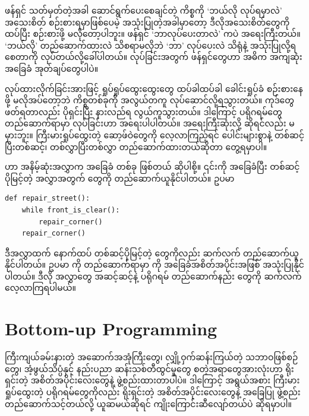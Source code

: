 ဖန်ရှင် သတ်မှတ်တဲ့အခါ ဆောင်ရွက်ပေးစေချင်တဲ့ ကိစ္စကို ‘ဘယ်လို လုပ်ရမှာလဲ’ အသေးစိတ် စဉ်းစားရမှာဖြစ်ပေမဲ့ အသုံးပြုတဲ့အခါမှာတော့ ဒီလိုအသေးစိတ်တွေကို ထပ်ပြီး စဉ်းစားဖို့ မလိုတော့ပါဘူး။ ဖန်ရှင် ‘ဘာလုပ်ပေးတာလဲ’ ကပဲ အရေးကြီးတယ်။ ‘ဘယ်လို’ တည်ဆောက်ထားလဲ သိစရာမလိုဘဲ ‘ဘာ’ လုပ်ပေးလဲ သိရုံနဲ့ အသုံးပြုလို့ရစေတာကို  လုပ်တယ်လို့ခေါ်ပါတယ်။  လုပ်ခြင်းအတွက် ဖန်ရှင်တွေဟာ အဓိက အကျဆုံး အခြေခံ အုတ်ချပ်တွေပါပဲ။ 


 လုပ်ထားလိုက်ခြင်းအားဖြင့် ရှုပ်ရှုပ်ထွေးထွေးတွေ ထပ်ခါထပ်ခါ ခေါင်းရှုပ်ခံ စဉ်းစားနေဖို့ မလိုအပ်တော့ဘဲ ကိစ္စတစ်ခုကို အလွယ်တကူ လုပ်ဆောင်လို့ရသွားတယ်။ ကုဒ်တွေဖတ်ရတာလည်း ပိုရှင်းပြီး နားလည်ရ လွယ်ကူသွားတယ်။ ဒါကြောင့် ပရိုဂရမ်တွေ တည်ဆောက်ရာမှာ  လုပ်ခြင်းဟာ အရေးပါပါတယ်။ အရေးကြီးဆုံးလို့ ဆိုရင်လည်း မမှားဘူး။  ကြီးမားရှုပ်ထွေးတဲ့ ဆော့ဖ်ဝဲတွေကို လေ့လာကြည့်ရင်   ပေါင်းများစွာနဲ့ တစ်ဆင့်ပြီးတစ်ဆင့်၊ တစ်လွှာပြီးတစ်လွှာ တည်ဆောက်ထားတယ်ဆိုတာ တွေ့ရမှာပါ။

 ဟာ အနိမ့်ဆုံးအလွှာက အခြေခံ  တစ်ခု ဖြစ်တယ် ဆိုပါစို့။ ၎င်းကို အခြေခံပြီး တစ်ဆင့်ပိုမြင့်တဲ့ အလွှာအတွက်  တွေကို တည်ဆောက်ယူနိုင်ပါတယ်။ ဥပမာ
%
\setlength{\fboxsep}{0pt}
\begin{verbatim}
def repair_street():
    while front_is_clear():
        repair_corner()
    repair_corner()
\end{verbatim}
%
ဒီအလွှာထက် နောက်ထပ် တစ်ဆင့်ပိုမြင့်တဲ့  တွေကိုလည်း ဆက်လက် တည်ဆောက်ယူနိုင်ပါတယ်။ ဥပမာ  ကို တည်ဆောက်ရာမှာ  ကို အခြေခံအစိတ်အပိုင်းအဖြစ် အသုံးပြုနိုင်ပါတယ်။ ဒီလို  အလွှာတွေ အဆင့်ဆင့်နဲ့ ပရိုဂရမ် တည်ဆောက်နည်း တွေကို ဆက်လက်လေ့လာကြရပါမယ်။


\section{Bottom-up Programming}

ကြီးကျယ်ခမ်းနားတဲ့ အဆောက်အအုံကြီးတွေ၊ လျှို့ဝှက်ဆန်းကြယ်တဲ့ သဘာဝဖြစ်စဉ်တွေ၊ အံ့ဖွယ်သိပ္ပံနှင့် နည်းပညာ ဆန်းသစ်တီထွင်မှုတွေ စတဲ့အရာတွေအားလုံးဟာ ရိုးရှင်းတဲ့ အစိတ်အပိုင်းလေးတွေနဲ့ ဖွဲ့စည်းထားတာပါပဲ။ ဒါကြောင့် အရွယ်အစား ကြီးမား ရှုပ်ထွေးတဲ့ ပရိုဂရမ်တွေကိုလည်း ရိုးရှင်းတဲ့ အစိတ်အပိုင်းလေးတွေနဲ့ အခြေပြု ဖွဲ့စည်းတည်ဆောက်သင့်တယ်လို့ ယူဆမယ်ဆိုရင် ကျိုးကြောင်းဆီလျော်တယ်ပဲ ဆိုရမှာပါ။

